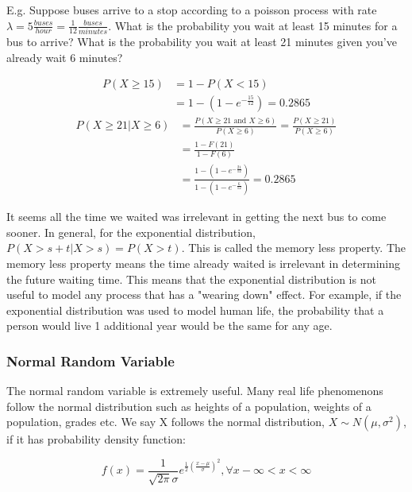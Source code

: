 \documentclass[12pt, letterpaper]{article}
\begin{document}
E.g. Suppose buses arrive to a stop according to a poisson process with rate \(\lambda = 5 \frac{buses}{hour} = \frac{1}{12} \frac{buses}{minutes}\). What is the probability you wait at least 15 minutes for a bus to arrive? What is the probability you wait at least 21 minutes given you've already wait 6 minutes?

\begin{align*}
P\left(X \geq 15\right) &= 1 - P\left(X < 15\right)\\
&= 1 - (1 - e^{-\frac{15}{12}}) = 0.2865
\end{align*}
\begin{align*}
P\left(X \geq 21 \vert X \geq 6\right) &= \frac{P\left(X \geq 21 \text{ and } X \geq 6\right)}{P\left(X \geq 6\right)} = \frac{P\left(X \geq 21\right)}{P\left(X \geq 6\right)}\\
&= \frac{1 - F\left(21\right)}{1 - F\left(6\right)}\\
&= \frac{1 - (1 - e^{- \frac{21}{12}})}{1 - (1 - e^{- \frac{6}{12}})} = 0.2865
\end{align*}

It seems all the time we waited was irrelevant in getting the next bus to come sooner. In general, for the exponential distribution, \(P\left(X > s + t \vert X > s\right) = P\left(X > t\right)\). This is called the memory less property. The memory less property means the time already waited is irrelevant in determining the future waiting time. This means that the exponential distribution is not useful to model any process that has a "wearing down" effect. For example, if the exponential distribution was used to model human life, the probability that a person would live 1 additional year would be the same for any age.\\

\subsubsection{Normal Random Variable}
The normal random variable is extremely useful. Many real life phenomenons follow the normal distribution such as heights of a population, weights of a population, grades etc. We say X follows the normal distribution, \(X \sim N(\mu, \sigma^2)\), if it has probability density function:

\begin{equation}
f\left(x\right) = \frac{1}{\sqrt{2\pi} \sigma} e^{\frac{1}{2} (\frac{x - \mu}{\sigma})^2}, \forall x -\infty < x < \infty
\end{equation}\\
\end{document}
